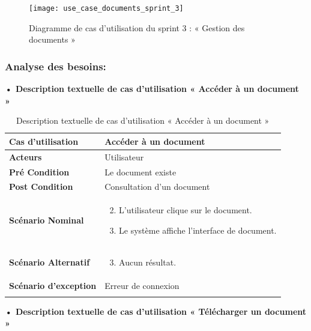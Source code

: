 \begin{figure}[H]
  \centering
  \texttt{[image: use\_case\_documents\_sprint\_3]}
  \caption{Diagramme de cas d'utilisation du sprint 3 : « Gestion des documents »}
  \label{fig:UseCaseDiagramSprint3}
\end{figure}


\subsubsection{Analyse des besoins:}
\textbf{•	Description textuelle de cas d'utilisation « Accéder à un document »}

\begin{longtable}{|p{5cm}|p{10cm}|}
\hline
\textbf{Cas d'utilisation}&Accéder à un document\\
\hline
\textbf{Acteurs}&Utilisateur\\
\hline
\textbf{Pré Condition}&Le document existe\\
\hline
\textbf{Post Condition}&Consultation d'un document\\
\hline
\textbf{Scénario Nominal}&
\vspace{-\baselineskip}
\begin{enumerate}
    \setcounter{enumi}{1}
    \item L'utilisateur clique sur le document.
    \item Le système affiche l'interface de document.
    
\end{enumerate}\\
\hline
\textbf{Scénario Alternatif}&
\vspace{-\baselineskip}
\begin{enumerate}
    \setcounter{enumi}{2}
    \item Aucun résultat.
\end{enumerate}\\
\hline
\textbf{Scénario d'exception}&Erreur de connexion\\
\hline
\caption{Description textuelle de cas d'utilisation « Accéder à un document »}
\label{tab:DescriptionTextuelleDeCasDUtilisationAccéderAUnDocument}
\end{longtable}

\textbf{•	Description textuelle de cas d'utilisation « Télécharger un document »}

